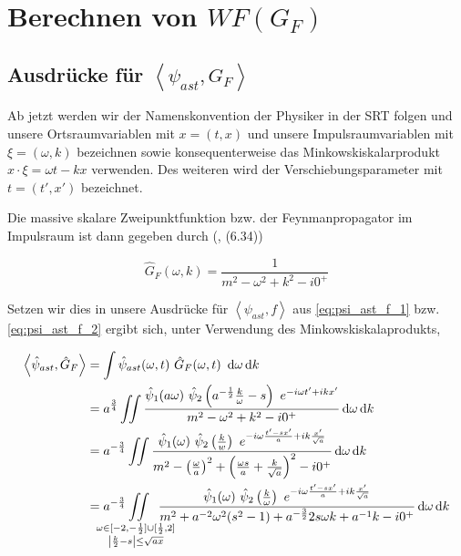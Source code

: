 
\section{Berechnen von $WF(G_F)$} %
\label{sec:berechnen_von_}

\subsection{Ausdrücke für $\left< \psi_{ast}, G_F\right>$} %
\label{sec:psiast_gf}

Ab jetzt werden wir der Namenskonvention der Physiker in der SRT folgen und unsere
Ortsraumvariablen mit $x = (t, x)$ und unsere Impulsraumvariablen mit $\xi = (\omega, k)$
bezeichnen sowie konsequenterweise das Minkowskiskalarprodukt $x \cdot \xi = \omega t - k x$
verwenden. Des weiteren wird der Verschiebungsparameter mit  $t = (t', x')$ bezeichnet.

Die massive skalare Zweipunktfunktion bzw. der Feynmanpropagator im Impulsraum ist dann
gegeben durch (\textcite{Schwartz2014}, (6.34))

\begin{equation}
\label{eq:gf}
    \hat G_F(\omega, k) = \frac{1}{m^2 - \omega^2 + k^2 - i 0^+}
\end{equation}

Setzen wir dies in unsere Ausdrücke für $\left< \psi_{ast}, f\right>$ aus \eqref{eq:psi_ast_f_1}
bzw. \eqref{eq:psi_ast_f_2} ergibt sich, unter Verwendung des Minkowskiskalaprodukts,

\begin{align}
\left< \hat\psi_{ast}, \hat G_F \right> &=
    \int \hat \psi_{ast}(\omega, t) ~\hat G_F(\omega, t) ~\d \omega \d k
    \nonumber \\
    &=
    a^{\frac{3}{4}} \iint \frac{
        \hat \psi_1 (a \omega)
        ~\hat \psi_2 \left(a^{-\frac{1}{2}}\frac{k}{\omega} - s\right)
        ~ e^{-i\omega t' + i k x'}
    }
    {
        m^2 - \omega^2 + k^2 - i 0^+
    }
    \d \omega \d k
    \nonumber \\
    &=
    a^{-\frac{3}{4}} \iint \frac{
        \hat\psi_1(\omega)
        ~\hat \psi_2\left(\tfrac{k}{w}\right)
        ~e^{-i \omega \frac{t' - sx'}{a} + ik \frac{x'}{\sqrt{a}}}
    }
    {
        m^2 - \left(\frac{\omega}{a}\right)^2
        + \left(\frac{\omega s}{a} + \frac{k}{\sqrt{a}}\right)^2 - i0^+
    }
    \d \omega \d k \nonumber \\
    &=
    a^{-\frac{3}{4}}
    \kern -2em \iint
    \limits_{
    \substack{
        \omega \in [-2, -\frac{1}{2}]\cup[\frac{1}{2},2] \\
        \left|\frac{k}{2}-s\right| \leq \sqrt{ax}
        }
    }
    \kern -1.5em
    \frac{
        \hat\psi_1(\omega)
        ~\hat \psi_2\left(\tfrac{k}{\omega}\right)
        ~e^{-i \omega \frac{t' - sx'}{a} + ik \frac{x'}{\sqrt{a}}}
    }
    {
        m^2 + a^{-2} \omega^2 (s^2 - 1) + a^{-\frac{3}{2}} 2 s \omega k + a^{-1} k  - i0^+
    }
    \d \omega \d k
    \label{eq:psi_ast_gf_1}
\end{align}

